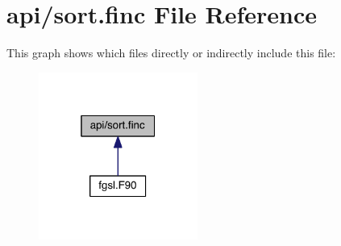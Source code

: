 \hypertarget{sort_8finc}{\section{api/sort.finc File Reference}
\label{sort_8finc}
}
This graph shows which files directly or indirectly include this file\-:\nopagebreak
\begin{figure}[H]
\begin{center}
\leavevmode
\includegraphics[width=148pt]{sort_8finc__dep__incl}
\end{center}
\end{figure}

